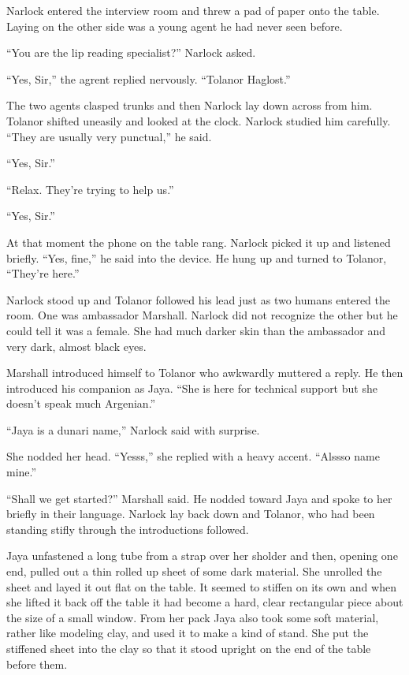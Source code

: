 
Narlock entered the interview room and threw a pad of paper onto the table. Laying on the other
side was a young agent he had never seen before.

``You are the lip reading specialist?'' Narlock asked.

``Yes, Sir,'' the agrent replied nervously. ``Tolanor Haglost.''

The two agents clasped trunks and then Narlock lay down across from him. Tolanor shifted
uneasily and looked at the clock. Narlock studied him carefully. ``They are usually very
punctual,'' he said.

``Yes, Sir.''

``Relax. They're trying to help us.''

``Yes, Sir.''

At that moment the phone on the table rang. Narlock picked it up and listened briefly. ``Yes,
fine,'' he said into the device. He hung up and turned to Tolanor, ``They're here.''

Narlock stood up and Tolanor followed his lead just as two humans entered the room. One was
ambassador Marshall. Narlock did not recognize the other but he could tell it was a female. She
had much darker skin than the ambassador and very dark, almost black eyes.

Marshall introduced himself to Tolanor who awkwardly muttered a reply. He then introduced his
companion as Jaya. ``She is here for technical support but she doesn't speak much Argenian.''

``Jaya is a dunari name,'' Narlock said with surprise.

She nodded her head. ``Yesss,'' she replied with a heavy accent. ``Alssso name mine.''

``Shall we get started?'' Marshall said. He nodded toward Jaya and spoke to her briefly in their
language. Narlock lay back down and Tolanor, who had been standing stifly through the
introductions followed.

Jaya unfastened a long tube from a strap over her sholder and then, opening one end, pulled out
a thin rolled up sheet of some dark material. She unrolled the sheet and layed it out flat on
the table. It seemed to stiffen on its own and when she lifted it back off the table it had
become a hard, clear rectangular piece about the size of a small window. From her pack Jaya also
took some soft material, rather like modeling clay, and used it to make a kind of stand. She put
the stiffened sheet into the clay so that it stood upright on the end of the table before them.

